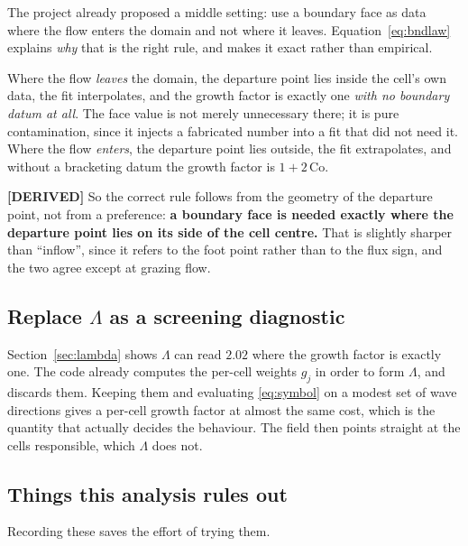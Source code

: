 \documentclass[11pt,a4paper]{article}
\newcommand{\derived}{\textcolor{blue!50!black}{\textbf{[DERIVED]}}}
\begin{document}
The project already proposed a middle setting: use a boundary face as data where the flow
enters the domain and not where it leaves. Equation~\eqref{eq:bndlaw} explains \emph{why} that
is the right rule, and makes it exact rather than empirical.

Where the flow \emph{leaves} the domain, the departure point lies inside the cell's own data,
the fit interpolates, and the growth factor is exactly one \emph{with no boundary datum at
all}. The face value is not merely unnecessary there; it is pure contamination, since it
injects a fabricated number into a fit that did not need it. Where the flow \emph{enters}, the
departure point lies outside, the fit extrapolates, and without a bracketing datum the growth
factor is $1 + 2\,\mathrm{Co}$.

\derived{} So the correct rule follows from the geometry of the departure point, not from a
preference: \textbf{a boundary face is needed exactly where the departure point lies on its
side of the cell centre.} That is slightly sharper than ``inflow'', since it refers to the
foot point rather than to the flux sign, and the two agree except at grazing flow.

\subsection{Replace $\Lambda$ as a screening diagnostic}

Section~\ref{sec:lambda} shows $\Lambda$ can read $2.02$ where the growth factor is exactly
one. The code already computes the per-cell weights $g_j$ in order to form $\Lambda$, and
discards them. Keeping them and evaluating \eqref{eq:symbol} on a modest set of wave
directions gives a per-cell growth factor at almost the same cost, which is the quantity that
actually decides the behaviour. The field then points straight at the cells responsible,
which $\Lambda$ does not.

\subsection{Things this analysis rules out}

Recording these saves the effort of trying them.
\end{document}
